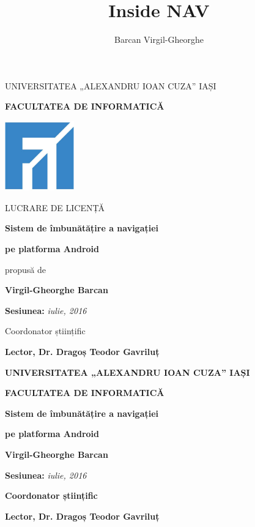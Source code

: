 \documentclass[12pt, a4paper, oneside]{article}
\title{Inside NAV}
\author{Barcan Virgil-Gheorghe}
\begin{document}
\pagestyle{empty}
\centerline{\small{UNIVERSITATEA „ALEXANDRU IOAN CUZA” IAȘI}}
\vspace{0.5cm}
\centerline{\textbf{\Large{\textsf{FACULTATEA DE INFORMATICĂ}}}}
\vspace{2.5cm}
\begin{center}
	\includegraphics[width=3cm,height=3cm]{sigla_FII.png}
\end{center}
\vspace{2.5cm}
\centerline{\Large{LUCRARE DE LICENȚĂ}}
\vspace{1cm}
\centerline{\textbf{\LARGE{Sistem de îmbunătățire a navigației}}}
\vspace{0.2cm}
\centerline{\textbf{\LARGE{pe platforma Android}}}
\vspace{1cm}
\centerline{propusă de}
\vspace{1cm}
\centerline{\textbf{\Large{\textsf{Virgil-Gheorghe Barcan}}}}
\vspace{1.5cm}
\centerline{\textsf{\textbf{Sesiunea:} \textit{iulie, 2016}}}
\vspace{0.5cm}
\centerline{Coordonator științific}
\vspace{0.5cm}
\centerline{\textsf{\textbf{\large{Lector, Dr. Dragoș Teodor Gavriluț}}}}

\clearpage

\mbox{}
\thispagestyle{empty}
\newpage

\pagestyle{empty}
\centerline{\textbf{\large{\textsf{UNIVERSITATEA „ALEXANDRU IOAN CUZA” IAȘI}}}}
\vspace{0.5cm}
\centerline{\textbf{\large{\textsf{FACULTATEA DE INFORMATICĂ}}}}
\vspace{5cm}
\centerline{\textbf{\LARGE{Sistem de îmbunătățire a navigației}}}
\vspace{0.2cm}
\centerline{\textbf{\LARGE{pe platforma Android}}}
\vspace{3cm}
\centerline{\textbf{\Large{\textsf{Virgil-Gheorghe Barcan}}}}
\vspace{2cm}
\centerline{\Large{{\textsf{\textbf{Sesiunea:} \textit{iulie, 2016}}}}}
\vspace{4.5cm}
\centerline{\textbf{Coordonator științific}}
\vspace{0.5cm}
\centerline{\textsf{\textbf{\large{Lector, Dr. Dragoș Teodor Gavriluț}}}}
\end{document}
